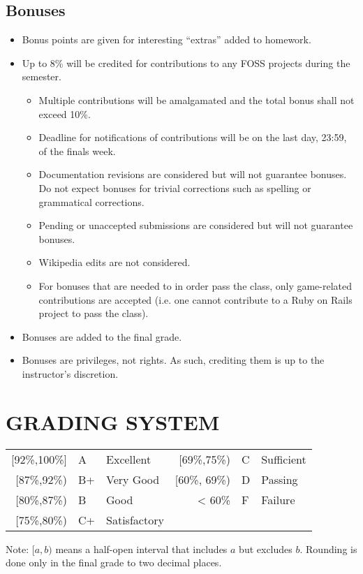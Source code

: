 \documentclass[10pt]{article}
\begin{document}
\subsection{Bonuses}
\begin{itemize}[noitemsep]
\item Bonus points are given for interesting ``extras'' added to homework.
\item Up to 8\% will be credited for contributions to any FOSS projects during the semester.
	\begin{itemize}[noitemsep]
		\item Multiple contributions will be amalgamated and the total bonus shall not exceed 10\%.
		\item Deadline for notifications of contributions will be on the last day, 23:59, of the finals week.
		\item Documentation revisions are considered but will not guarantee bonuses. Do not expect bonuses for trivial corrections such as spelling or grammatical corrections.
		\item Pending or unaccepted submissions are considered but will not guarantee bonuses.
		\item Wikipedia edits are not considered.
		\item For bonuses that are needed to in order pass the class, only game-related contributions are accepted (i.e. one cannot contribute to a Ruby on Rails project to pass the class).
	\end{itemize}
\item Bonuses are added to the final grade.
\item Bonuses are privileges, not rights. As such, crediting them is up to the instructor's discretion.
\end{itemize}

\section{GRADING SYSTEM}
\begin{center}
	\begin{tabular}{rll|rll}
	{[}92\%,100\%] & A & Excellent & 	{[}69\%,75\%) & C & Sufficient\\
	{[}87\%,92\%) & B+ & Very Good &			{[}60\%, 69\%) & D & Passing\\
	{[}80\%,87\%) & B & Good & 			< 60\% & F & Failure\\
	{[}75\%,80\%) & C+ & Satisfactory \\
	\end{tabular}
\end{center}
Note: $[a,b)$ means a half-open interval that includes $a$ but excludes $b$. Rounding is done only in the final grade to two decimal places.
\end{document}
